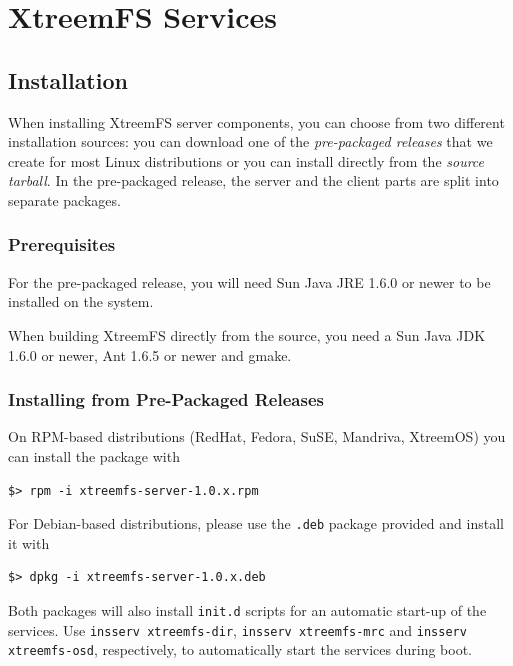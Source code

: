 \documentclass[a4paper,10pt]{book}
\begin{document}
\chapter{XtreemFS Services}

\section{Installation}

When installing XtreemFS server components, you can choose from two different installation sources: you can download one of the \emph{pre-packaged releases} that we create for most Linux distributions or you can install directly from the \emph{source tarball}. In the pre-packaged release, the server and the client parts are split into separate packages.

\subsection{Prerequisites}

For the pre-packaged release, you will need Sun Java JRE 1.6.0 or newer to be installed on the system.

When building XtreemFS directly from the source, you need a Sun Java JDK 1.6.0 or newer, Ant 1.6.5 or newer and gmake.

\subsection{Installing from Pre-Packaged Releases}

On RPM-based distributions (RedHat, Fedora, SuSE, Mandriva, XtreemOS) you can install the package with


\begin{verbatim}
$> rpm -i xtreemfs-server-1.0.x.rpm
\end{verbatim}


For Debian-based distributions, please use the \texttt{.deb} package provided and install it with


\begin{verbatim}
$> dpkg -i xtreemfs-server-1.0.x.deb
\end{verbatim}


Both packages will also install \texttt{init.d} scripts for an automatic start-up of the services. Use \texttt{insserv xtreemfs-dir}, \texttt{insserv xtreemfs-mrc} and \texttt{insserv xtreemfs-osd}, respectively, to automatically start the services during boot.
\end{document}
